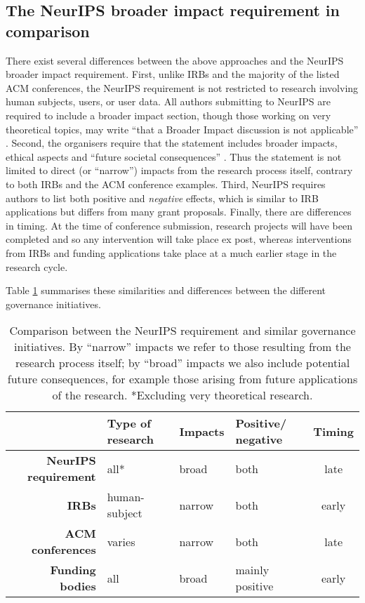 \documentclass[11pt,english]{article}
\begin{document}
	\subsection*{The NeurIPS broader impact requirement in comparison}
	
	There exist several differences between the above approaches and the NeurIPS broader impact requirement. First, unlike IRBs and the majority of the listed ACM conferences, the NeurIPS requirement is not restricted to research involving human subjects, users, or user data. All authors submitting to NeurIPS are required to include a broader impact section, though those working on very theoretical topics, may write ``that a Broader Impact discussion is not applicable'' \citep{neurips_faq_neurips_2020}. Second, the organisers require that the statement includes broader impacts, ethical aspects and ``future societal consequences'' \citep{neurips_call_2020}. Thus the statement is not limited to direct (or ``narrow'') impacts from the research process itself, contrary to both IRBs and the ACM conference examples. Third, NeurIPS requires authors to list both positive and \textit{negative} effects, which is similar to IRB applications but differs from many grant proposals. Finally, there are differences in timing. At the time of conference submission, research projects will have been completed and so any intervention will take place ex post, whereas interventions from IRBs and funding applications take place at a much earlier stage in the research cycle. 
	
	Table \ref{table1} summarises these similarities and differences between the different governance initiatives.
	
	\begin{table}[h!]
		\begin{center}
			\begin{tabularx}{\textwidth}{| r | >{\centering\arraybackslash}X | >{\centering\arraybackslash}X | >{\centering\arraybackslash}X | c |} \hline 
				& \textbf{Type of research} & \textbf{Impacts} & \textbf{Positive/ negative} & \textbf{Timing} \\ 
				\hline
				\textbf{NeurIPS requirement} & all* & broad & both & late \\ 
				\hline
				\textbf{IRBs} & human-subject & narrow & both & early \\ 
				\hline
				\textbf{ACM conferences} & varies & narrow & both & late \\
				\hline
				\textbf{Funding bodies} & all & broad & mainly positive & early \\
				\hline
			\end{tabularx}
			\caption{Comparison between the NeurIPS requirement and similar governance initiatives. By ``narrow'' impacts we refer to those resulting from the research process itself; by ``broad'' impacts we also include potential future consequences, for example those arising from future applications of the research. *Excluding very theoretical research.}
			\label{table1}
		\end{center}
	\end{table}
	
\end{document}
